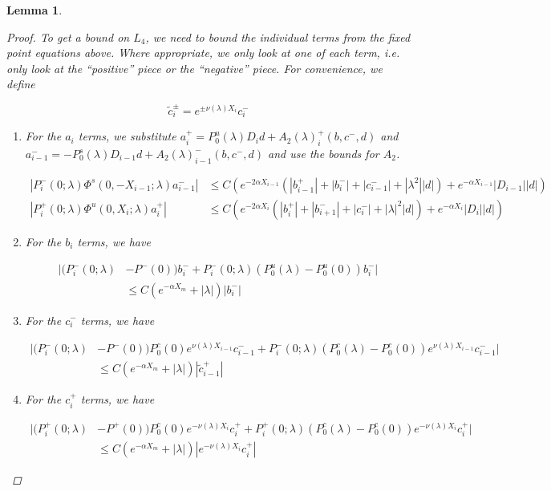 \documentclass[12pt]{article}
\newtheorem{lemma}{Lemma}
\begin{document}
\begin{lemma}
\begin{proof}
To get a bound on $L_4$, we need to bound the individual terms from the fixed point equations above. Where appropriate, we only look at one of each term, i.e. only look at the ``positive'' piece or the ``negative'' piece. For convenience, we define

\[
\tilde{c}_i^\pm = e^{\pm \nu(\lambda) X_i} c_i^-
\]

\begin{enumerate}

\item For the $a_i$ terms, we substitute $a_i^+ = P_0^u(\lambda) D_i d + A_2(\lambda)_i^+(b, c^-, d)$ and $a_{i-1}^- = -P_0^s(\lambda) D_{i-1} d + A_2(\lambda)_{i-1}^-(b, c^-, d)$ and use the bounds for $A_2$.

\begin{align*}
|P_i^-(0; \lambda) \Phi^s(0, -X_{i-1}; \lambda) a_{i-1}^-| 
&\leq C \left( e^{-2 \alpha X_{i-1}} (|b_{i-1}^+| + |b_i^-| + |c_{i-1}^-| + |\lambda^2||d|) + e^{- \alpha X_{i-1}} |D_{i-1}||d| \right)\\
|P_i^+(0; \lambda) \Phi^u(0, X_i; \lambda) a_i^+| 
&\leq C \left( e^{-2 \alpha X_i} (|b_i^+| + |b_{i+1}^-| + |c_i^-| + |\lambda|^2|d|) + e^{-\alpha X_i}|D_i||d| \right)
\end{align*}

\item For the $b_i$ terms, we have

\begin{align*}
|(P_i^-(0; \lambda) &- P^-(0))b_i^- + P_i^-(0; \lambda)(P_0^u(\lambda) - P_0^u(0))b_i^-| \\
&\leq C ( e^{-\alpha X_m} + |\lambda|)|b_i^-|
\end{align*}

\item For the $c_i^-$ terms, we have

\begin{align*}
|(P_i^-(0; \lambda) &- P^-(0)) P_0^c(0) e^{\nu(\lambda) X_{i-1}} c_{i-1}^- + P_i^-(0; \lambda) (P_0^c(\lambda) - P_0^c(0)) e^{\nu(\lambda) X_{i-1}} c_{i-1}^- | \\
&\leq C (e^{-\alpha X_m} + |\lambda|)|\tilde{c}_{i-1}^+|
\end{align*}

\item For the $c_i^+$ terms, we have

\begin{align*}
|(P_i^+(0; \lambda) &- P^+(0))P_0^c(0) e^{-\nu(\lambda)X_i} c_i^+ + P_i^+(0; \lambda) (P_0^c(\lambda) - P_0^c(0)) e^{-\nu(\lambda)X_i} c_i^+| \\
&\leq C (e^{-\alpha X_m} + |\lambda|)|e^{-\nu(\lambda)X_i} c_i^+|
\end{align*}


\end{enumerate}
\end{proof}
\end{lemma}
\end{document}
